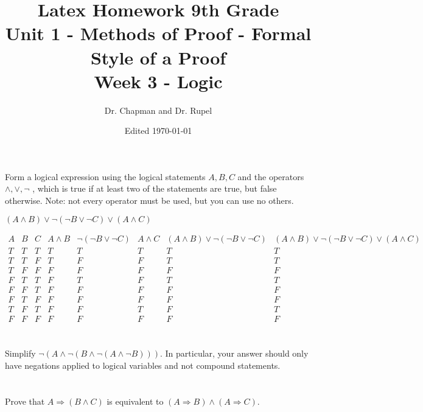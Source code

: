 \documentclass{article}
\title{Latex Homework 9th Grade\\ Unit 1 - Methods of Proof - Formal Style of a Proof\\ Week 3 - Logic}
\author{Dr. Chapman and Dr. Rupel}
\date{Edited \today}
\begin{document}
\maketitle

\section{}
    Form a logical expression using the logical statements \(A,B,C\) and the operators \(\wedge,\vee,\neg\) , which is true if at least two of the statements are true, but false otherwise. Note: not every operator must be used, but you can use no others.

$(A\land B)\lor\neg(\neg B \lor \neg C)\lor(A \land C)$


$\begin{array}{c|c|c|c|c|c|c|c}A&B&C& A\land B& \neg(\neg B\lor \neg C)&A\land C&(A\land B)\lor\neg(\neg B\lor\neg C)&(A\land B)\lor\neg(\neg B\lor\neg C)\lor(A\land C)\\
\hline T&T&T&T&T&T&T&T \\ \hline T&T&F&T&F&F&T&T \\ \hline T&F&F&F&F&F&F&F \\ \hline F&T&T&F&T&F&T&T \\ \hline F&F&T&F&F&F&F&F
\\ \hline F&T&F&F&F&F&F&F \\ \hline T&F&T&F&F&T&F&T \\ \hline F&F&F&F&F&F&F&F
\end{array}$


\section{}
    Simplify \(\neg(A\wedge\neg(B\wedge\neg(A\wedge\neg B)))\). In particular, your answer should only have negations applied to logical variables and not compound statements.
    
\section{}
    Prove that \(A\Rightarrow(B\wedge C)\) is equivalent to \((A\Rightarrow B)\wedge(A\Rightarrow C)\).
    
\end{document}
